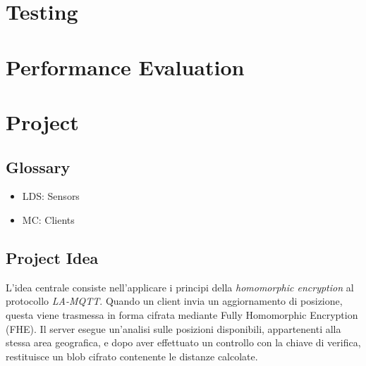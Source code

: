 \documentclass[12pt,a4paper,twoside]{book}
\begin{document}
\chapter{Testing}

\chapter{Performance Evaluation}

\chapter{Project}
\section{Glossary}
\begin{itemize}
    \item LDS: Sensors
    \item MC: Clients
\end{itemize}

\section{Project Idea}
L'idea centrale consiste nell'applicare i principi della \emph{homomorphic encryption} al protocollo \emph{LA-MQTT}. Quando un client invia un aggiornamento di posizione, questa viene trasmessa in forma cifrata mediante Fully Homomorphic Encryption (FHE). Il server esegue un'analisi sulle posizioni disponibili, appartenenti alla stessa area geografica, e dopo aver effettuato un controllo con la chiave di verifica, restituisce un blob cifrato contenente le distanze calcolate.
\end{document}
